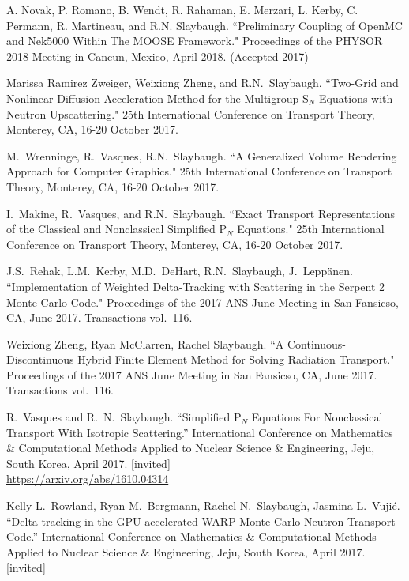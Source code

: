 \begin{bibsection}
\item A. Novak, P. Romano, B. Wendt, R. Rahaman, E. Merzari, L. Kerby, C. Permann, R. Martineau, and R.N. Slaybaugh. ``Preliminary Coupling of OpenMC and Nek5000 Within The MOOSE Framework." Proceedings of the PHYSOR 2018 Meeting in Cancun, Mexico, April 2018. (Accepted 2017)

\item  Marissa Ramirez Zweiger, Weixiong Zheng, and R.N.\ Slaybaugh. ``Two-Grid and Nonlinear Diffusion Acceleration Method for the Multigroup S$_N$ Equations with Neutron Upscattering." 25th International Conference on Transport Theory, Monterey, CA, 16-20 October 2017.

\item M.\ Wrenninge, R.\ Vasques, R.N.\ Slaybaugh. ``A Generalized Volume Rendering Approach for Computer Graphics." 25th International Conference on Transport Theory, Monterey, CA, 16-20 October 2017.

\item  I.\ Makine, R.\ Vasques, and R.N.\ Slaybaugh. ``Exact Transport Representations of the Classical and Nonclassical Simplified P$_N$ Equations." 25th International Conference on Transport Theory, Monterey, CA, 16-20 October 2017.

\item J.S.\ Rehak, L.M.\ Kerby, M.D.\ DeHart, R.N.\ Slaybaugh, J.\ Lepp\"{a}nen. ``Implementation of Weighted Delta-Tracking with Scattering in the Serpent 2 Monte Carlo Code." Proceedings of the 2017 ANS June Meeting in San Fansicso, CA, June 2017. Transactions vol.\ 116.

\item Weixiong Zheng, Ryan McClarren, Rachel Slaybaugh. ``A Continuous-Discontinuous Hybrid Finite Element Method for Solving Radiation Transport." Proceedings of the 2017 ANS June Meeting in San Fansicso, CA, June 2017. Transactions vol.\ 116.

\item R.\ Vasques and R.\ N.\ Slaybaugh. ``Simplified P$_N$ Equations For Nonclassical Transport With Isotropic Scattering.'' International Conference on Mathematics \& Computational Methods Applied to Nuclear Science \& Engineering, Jeju, South Korea, April 2017. [invited]\\
\url{https://arxiv.org/abs/1610.04314}

\item Kelly L.\ Rowland, Ryan M.\ Bergmann, Rachel N.\ Slaybaugh, Jasmina L.\ Vuji\'c. ``Delta-tracking in the GPU-accelerated WARP Monte Carlo Neutron Transport Code.'' International Conference on Mathematics \& Computational Methods Applied to Nuclear Science \& Engineering, Jeju, South Korea, April 2017. [invited]


\end{bibsection}

